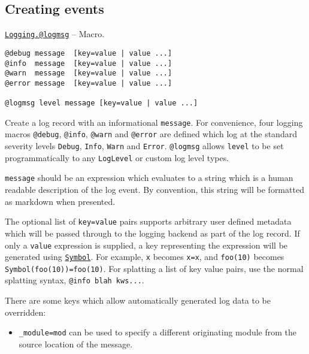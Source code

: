\hypertarget{16245113775601037343}{}


\subsection{Creating events}


\hypertarget{2787319849348710857}{}
\hyperlink{2787319849348710857}{\texttt{Logging.@logmsg}}  -- {Macro.}

\begin{adjustwidth}{2em}{0pt}


\begin{verbatim}
@debug message  [key=value | value ...]
@info  message  [key=value | value ...]
@warn  message  [key=value | value ...]
@error message  [key=value | value ...]

@logmsg level message [key=value | value ...]
\end{verbatim}

Create a log record with an informational \texttt{message}.  For convenience, four logging macros \texttt{@debug}, \texttt{@info}, \texttt{@warn} and \texttt{@error} are defined which log at the standard severity levels \texttt{Debug}, \texttt{Info}, \texttt{Warn} and \texttt{Error}.  \texttt{@logmsg} allows \texttt{level} to be set programmatically to any \texttt{LogLevel} or custom log level types.

\texttt{message} should be an expression which evaluates to a string which is a human readable description of the log event.  By convention, this string will be formatted as markdown when presented.

The optional list of \texttt{key=value} pairs supports arbitrary user defined metadata which will be passed through to the logging backend as part of the log record.  If only a \texttt{value} expression is supplied, a key representing the expression will be generated using \hyperlink{18332791376992528422}{\texttt{Symbol}}. For example, \texttt{x} becomes \texttt{x=x}, and \texttt{foo(10)} becomes \texttt{Symbol({\textquotedbl}foo(10){\textquotedbl})=foo(10)}.  For splatting a list of key value pairs, use the normal splatting syntax, \texttt{@info {\textquotedbl}blah{\textquotedbl} kws...}.

There are some keys which allow automatically generated log data to be overridden:

\begin{itemize}
\item \texttt{\_module=mod} can be used to specify a different originating module from the source location of the message.



\end{itemize}
\end{adjustwidth}

